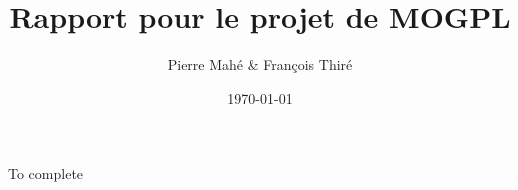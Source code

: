 \documentclass[a4paper, titlepage, oneside, 12pt]{article}%
\title{Rapport pour le projet de MOGPL}
\date{\today}
\author{Pierre Mahé \& François Thiré}
\begin{document}
\maketitle

To complete
\end{document}
